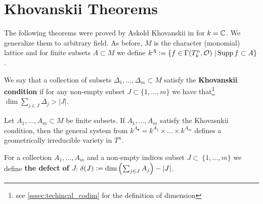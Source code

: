 \section{Khovanskii Theorems}\label{sec:khovanskii}

The following theorems were proved by Askold Khovanskii in \cite{Khovanskii2016} for $k = \mathbb C$. We generalize them to arbitrary field. As before, $M$ is the character (monomial) lattice and for finite subsets $A \subset M$ we define $k^A \vcentcolon= \{ f \in \Gamma(T^n_k, \mathcal O)\ | \operatorname{Supp} f \subset A \}$.

\begin{definition}\label{def:khovanskii_condition}
    We say that a collection of subsets $\Delta_1, \dots, \Delta_m \subset M$ satisfy the \textbf{Khovanskii condition} if for any non-empty subset $J \subset \{ 1, \dots, m \}$ we have that\footnote{see \autoref{sssec:techincal_codim} for the definition of dimension} $\dim \sum_{j \in J} \Delta_j > |J|$.
\end{definition}

\begin{theorem}[Irreducibility]\label{thm:khovanskii_irreducibility}
    Let $A_1, \dots, A_m \subset M$ be finite subsets. If $A_1, \dots, A_m$ satisfy the Khovasnkii condition, then the general system from $k^{A_\bullet} = k^{A_1} \times \dots \times k^{A_m}$ defines a geometrically irreducible variety in $T^n$.
\end{theorem}

\begin{definition}
    For a collection $A_1, \dots, A_m$ and a non-empty indices subset $J \subset ~\{ 1, \dots, m \}$ we define \textbf{the defect of $J$}: $\delta(J) \vcentcolon= \dim \left( \sum_{j \in J} A_j \right) - |J|$.
\end{definition}

